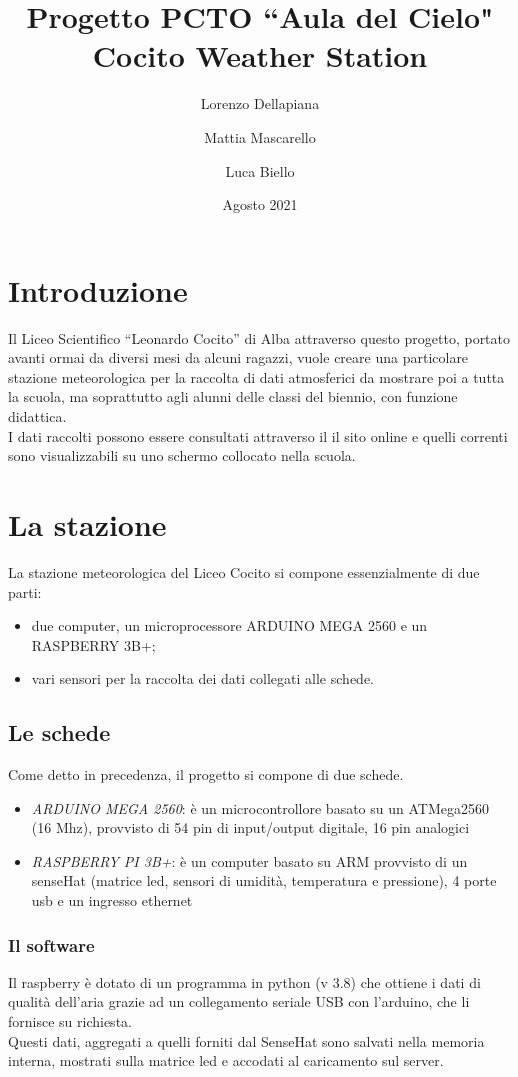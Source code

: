 \documentclass{article}
\title{%
  Progetto PCTO ``Aula del Cielo" \\
  \large Cocito Weather Station}
\author{Lorenzo Dellapiana\and Mattia Mascarello\and Luca Biello}
\date{Agosto 2021}
\def\blankpage{%
      \clearpage%
      \thispagestyle{empty}%
      \addtocounter{page}{-1}%
      \null%
      \clearpage}
\begin{document}
\maketitle
\pagebreak
\vspace*{\fill}
\tableofcontents
\vspace*{\fill}
\blankpage
\pagebreak
\section{Introduzione}
Il Liceo Scientifico “Leonardo Cocito” di Alba attraverso questo progetto, portato avanti ormai da diversi mesi da alcuni ragazzi, vuole creare una particolare stazione meteorologica per la raccolta di dati atmosferici da mostrare poi a tutta la scuola, ma soprattutto agli alunni delle classi del biennio, con funzione didattica.\\
I dati raccolti possono essere consultati attraverso il il sito online e quelli correnti sono visualizzabili su uno schermo collocato nella scuola.
\section{La stazione}
La stazione meteorologica del Liceo Cocito si compone essenzialmente di due parti:
\begin{itemize}
\item due computer, un microprocessore ARDUINO MEGA 2560 e un RASPBERRY 3B+;\\
\item vari sensori per la raccolta dei dati collegati alle schede.
\end{itemize}
\subsection{Le schede}
Come detto in precedenza, il progetto si compone di due schede.
\begin{itemize}
\item \emph{ARDUINO MEGA 2560}: è un microcontrollore basato su un ATMega2560 (16 Mhz), provvisto di 54 pin di input/output digitale, 16 pin analogici\\ 
\item \emph{RASPBERRY PI 3B+}: è un computer basato su ARM provvisto di un senseHat (matrice led, sensori di umidità, temperatura e pressione), 4 porte usb e un ingresso ethernet
\end{itemize}
\subsubsection{Il software}
Il raspberry è dotato di un programma in python (v 3.8) che ottiene i dati di qualità dell'aria grazie ad un collegamento seriale USB con l'arduino, che li fornisce su richiesta.\\
Questi dati, aggregati a quelli forniti dal SenseHat sono salvati nella memoria interna, mostrati sulla matrice led e accodati al caricamento sul server.
\end{document}
